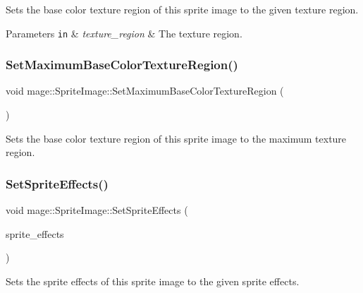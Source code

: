 Sets the base color texture region of this sprite image to the given texture region.


\begin{DoxyParams}[1]{Parameters}
\mbox{\tt in}  & {\em texture\+\_\+region} & The texture region. \\
\hline
\end{DoxyParams}
\hypertarget{classmage_1_1_sprite_image_aa08a58d1e94f8e26031b97b56b0c8c6a}{}\label{classmage_1_1_sprite_image_aa08a58d1e94f8e26031b97b56b0c8c6a} 
\subsubsection{\texorpdfstring{Set\+Maximum\+Base\+Color\+Texture\+Region()}{SetMaximumBaseColorTextureRegion()}}
{\footnotesize\ttfamily void mage\+::\+Sprite\+Image\+::\+Set\+Maximum\+Base\+Color\+Texture\+Region (\begin{DoxyParamCaption}{ }\end{DoxyParamCaption})\hspace{0.3cm}{\ttfamily [noexcept]}}

Sets the base color texture region of this sprite image to the maximum texture region. \hypertarget{classmage_1_1_sprite_image_a81f8297413245635b505374068abe588}{}\label{classmage_1_1_sprite_image_a81f8297413245635b505374068abe588} 
\subsubsection{\texorpdfstring{Set\+Sprite\+Effects()}{SetSpriteEffects()}}
{\footnotesize\ttfamily void mage\+::\+Sprite\+Image\+::\+Set\+Sprite\+Effects (\begin{DoxyParamCaption}\item[{\hyperlink{namespacemage_a9cfe18123066ba4236f548f9de75d881}{Sprite\+Effect}}]{sprite\+\_\+effects }\end{DoxyParamCaption})\hspace{0.3cm}{\ttfamily [noexcept]}}

Sets the sprite effects of this sprite image to the given sprite effects.


